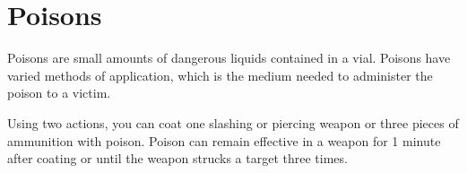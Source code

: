 \section{Poisons} \label{sec::poisons}
    Poisons are small amounts of dangerous liquids contained in a vial.
    Poisons have varied methods of application, which is the medium needed to administer the poison to a victim.

    Using two actions, you can coat one slashing or piercing weapon or three pieces of ammunition with poison.
    Poison can remain effective in a weapon for 1 minute after coating or until the weapon strucks a target three times.

